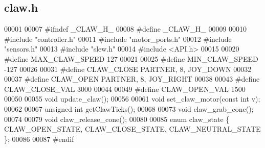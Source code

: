 \subsection{claw.\+h}
\label{claw_8h_source}

\begin{DoxyCode}
00001 
00007 \textcolor{preprocessor}{#ifndef \_CLAW\_H\_}
00008 \textcolor{preprocessor}{#define \_CLAW\_H\_}
00009 
00010 \textcolor{preprocessor}{#include "controller.h"}
00011 \textcolor{preprocessor}{#include "motor_ports.h"}
00012 \textcolor{preprocessor}{#include "sensors.h"}
00013 \textcolor{preprocessor}{#include "slew.h"}
00014 \textcolor{preprocessor}{#include <API.h>}
00015 
00020 \textcolor{preprocessor}{#define MAX\_CLAW\_SPEED 127}
00021 
00025 \textcolor{preprocessor}{#define MIN\_CLAW\_SPEED -127}
00026 
00031 \textcolor{preprocessor}{#define CLAW\_CLOSE PARTNER, 8, JOY\_DOWN}
00032 
00037 \textcolor{preprocessor}{#define CLAW\_OPEN PARTNER, 8, JOY\_RIGHT}
00038 
00043 \textcolor{preprocessor}{#define CLAW\_CLOSE\_VAL 3000}
00044 
00049 \textcolor{preprocessor}{#define CLAW\_OPEN\_VAL 1500}
00050 
00055 \textcolor{keywordtype}{void} update_claw();
00056 
00061 \textcolor{keywordtype}{void} set_claw_motor(\textcolor{keyword}{const} \textcolor{keywordtype}{int} v);
00062 
00067 \textcolor{keywordtype}{unsigned} \textcolor{keywordtype}{int} getClawTicks();
00068 
00073 \textcolor{keywordtype}{void} claw_grab_cone();
00074 
00079 \textcolor{keywordtype}{void} claw_release_cone();
00080 
00085 \textcolor{keyword}{enum} claw_state \{ CLAW_OPEN_STATE, CLAW_CLOSE_STATE, CLAW_NEUTRAL_STATE \};
00086 
00087 \textcolor{preprocessor}{#endif}
\end{DoxyCode}
